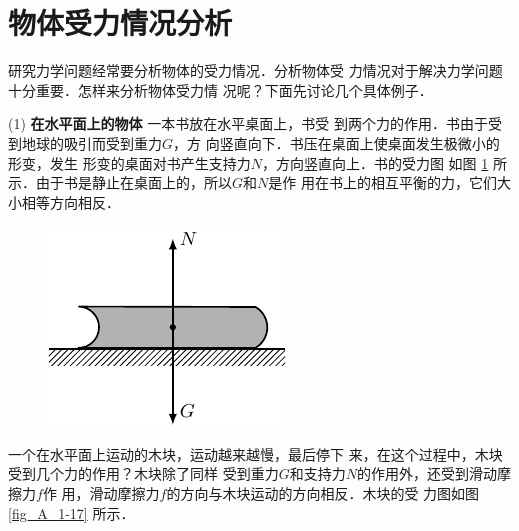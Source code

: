 \section{物体受力情况分析} 
    研究力学问题经常要分析物体的受力情况．分析物体受
力情况对于解决力学问题十分重要．怎样来分析物体受力情
况呢？下面先讨论几个具体例子．

    (1) \textbf{在水平面上的物体 }  一本书放在水平桌面上，书受
到两个力的作用．书由于受到地球的吸引而受到重力$G$，方
向竖直向下．书压在桌面上使桌面发生极微小的形变，发生
形变的桌面对书产生支持力$N$，方向竖直向上．书的受力图
如图 \ref{fig_A_1-16} 所示．由于书是静止在桌面上的，所以$G$和$N$是作
用在书上的相互平衡的力，它们大小相等方向相反．
\begin{figure} [htp]\centering
\includegraphics{fig/A/1-16.pdf} 
\caption{} \label{fig_A_1-16} 
\end{figure} 

    一个在水平面上运动的木块，运动越来越慢，最后停下
来，在这个过程中，木块受到几个力的作用？木块除了同样
受到重力$G$和支持力$N$的作用外，还受到滑动摩擦力$f$作
用，滑动摩擦力$f$的方向与木块运动的方向相反．木块的受
力图如图 \ref{fig_A_1-17} 所示．

